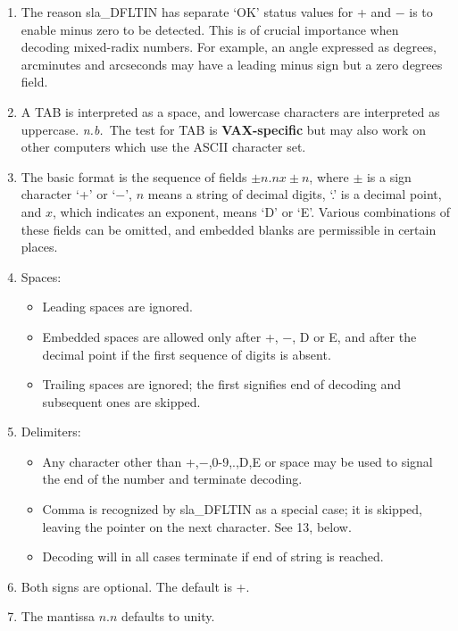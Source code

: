 {
 \begin{enumerate}
 \item The reason sla\_DFLTIN has separate `OK' status values
       for + and $-$ is to enable minus zero to be detected.
       This is of crucial importance
       when decoding mixed-radix numbers.  For example, an angle
       expressed as degrees, arcminutes and arcseconds may have a
       leading minus sign but a zero degrees field.
 \item A TAB is interpreted as a space, and lowercase characters are
       interpreted as uppercase.  {\it n.b.}\ The test for TAB is
       {\bf VAX-specific} but may also work on other computers
       which use the ASCII character set.
 \item The basic format is the sequence of fields $\pm n.n x \pm n$,
       where $\pm$ is a sign
       character `+' or `$-$', $n$ means a string of decimal digits,
       `.' is a decimal point, and $x$, which indicates an exponent,
       means `D' or `E'.  Various combinations of these fields can be
       omitted, and embedded blanks are permissible in certain places.
 \item Spaces:
       \begin{itemize}
       \item Leading spaces are ignored.
       \item Embedded spaces are allowed only after +, $-$, D or E,
             and after the decimal point if the first sequence of
             digits is absent.
       \item Trailing spaces are ignored;  the first signifies
             end of decoding and subsequent ones are skipped.
       \end{itemize}
 \item Delimiters:
       \begin{itemize}
       \item Any character other than +,$-$,0-9,.,D,E or space may be
             used to signal the end of the number and terminate decoding.
       \item Comma is recognized by sla\_DFLTIN as a special case; it
             is skipped, leaving the pointer on the next character.  See
             13, below.
       \item Decoding will in all cases terminate if end of string
             is reached.
       \end{itemize}
 \item Both signs are optional.  The default is +.
 \item The mantissa $n.n$ defaults to unity.

\end{enumerate}}
